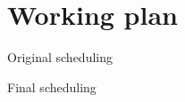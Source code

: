 \section{Working plan}
\begin{frame}{Original scheduling}
\centering
\vspace{1.4em}
\scalebox{0.25}{%

}
\end{frame}

\begin{frame}{Final scheduling}
\centering
\vspace{1.4em}
\scalebox{0.25}{
 
}
\end{frame}








%
%
%
%
%
%
%

%
%
%
%
%
%
%
%
%
%
%
%
%
%
%


